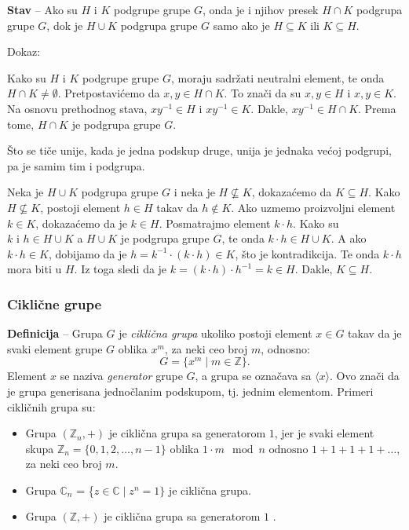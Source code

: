 \documentclass[a4paper,12pt]{article}
\begin{document}
\bigskip
\textbf{Stav} -- Ako su \( H \) i \( K \) podgrupe grupe \( G \), onda je i njihov presek \( H \cap K \) podgrupa grupe \( G \),
dok je \( H \cup K \) podgrupa grupe \( G \) samo ako je \( H \subseteq K \) ili \( K \subseteq H \).

Dokaz:

Kako su $H$ i $K$ podgrupe grupe $G$, moraju sadržati neutralni element, te onda \( H \cap K \neq \emptyset \). 
Pretpostavićemo da \( x, y \in H \cap K \). To znači da su \( x, y \in H \) i \( x, y \in K \). Na osnovu
prethodnog stava, \( xy^{-1} \in H \) i \( xy^{-1} \in K \). Dakle, \( xy^{-1} \in H \cap K \).
Prema tome, \( H \cap K \) je podgrupa grupe \( G \).
\smallskip

Što se tiče unije, kada je jedna podskup druge, unija je jednaka većoj podgrupi, pa je samim tim i podgrupa.

Neka je \(H \cup K \) podgrupa grupe \( G \) i neka je \( H \not\subseteq K \), dokazaćemo da \( K \subseteq H \).
Kako \( H \not\subseteq K \), postoji element \( h \in H \) takav da \( h \notin K \). Ako uzmemo proizvoljni
element \( k \in K \), dokazaćemo da je \( k \in H \). 
Posmatrajmo element \( k \cdot h \). Kako su \( k \text{ i } h \in H \cup K \) a \( H \cup K \) je podgrupa grupe \( G \),
te onda \( k \cdot h \in H \cup K \). A ako \( k \cdot h \in K \), dobijamo da je \( h = k^{-1} \cdot (k \cdot h) \in K \), što je kontradikcija.
Te onda \( k \cdot h \) mora biti u \( H \). Iz toga sledi da je \( k = (k \cdot h) \cdot h^{-1} = k \in H \). Dakle, \( K \subseteq H \). 

\bigskip
\subsubsection{Ciklične grupe}

\textbf{Definicija} -- Grupa \( G \) je \emph{ciklična grupa} ukoliko postoji element \( x \in G \) takav da je svaki element grupe \( G \) oblika \( x^m \), za neki ceo broj \( m \), odnosno:
\[G = \{ x^m \mid m \in \mathbb{Z} \}.\]
Element \( x \) se naziva \emph{generator} grupe \( G \), a grupa se označava sa \( \langle x \rangle \). 
Ovo znači da je grupa generisana jednočlanim podskupom, tj. jednim elementom.
Primeri cikličnih grupa su:
\begin{itemize}
  \item Grupa \( (\mathbb{Z}_n, +) \) je ciklična grupa sa generatorom \( 1 \), jer je svaki element skupa \( \mathbb{Z}_n = \{0, 1, 2, \dots, n-1\} \) oblika \( 1 \cdot m \mod n \text{ odnosno } 1 + 1 + 1 + 1 + \dots\), za neki ceo broj \( m \).
  \item Grupa \( \mathbb{C}_n\) = \{\( z \in \mathbb{C} \mid z^n = 1 \} \) je ciklična grupa.
  \item Grupa \( (\mathbb{Z}, +) \) je ciklična grupa sa generatorom \( 1 \) .
\end{itemize}
\end{document}
